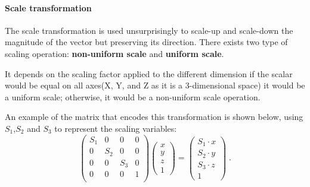 \documentclass[12pt,a4paper]{extarticle}
\begin{document}
\paragraph{Scale transformation} The scale transformation is used unsurprisingly to scale-up and scale-down the magnitude of the vector but preserving its direction. There exists two type of scaling operation: \textbf{non-uniform scale} and \textbf{uniform scale}. 

It depends on the scaling factor applied to the different dimension if the scalar would be equal on all axes(X, Y, and Z as it is a 3-dimensional space) it would be a uniform scale; otherwise, it would be a non-uniform scale operation. 

An example of the matrix that encodes this transformation is shown below, using $S_{1}$,$S_{2}$ and $S_{3}$ to represent the scaling variables:
\[
\begin{pmatrix}
S_{1} & 0 & 0 & 0\\
0 & S_{2} & 0 & 0\\
0 & 0 & S_{3} & 0\\
0 & 0 & 0 & 1\\
\end{pmatrix}
\begin{pmatrix}
x\\
y\\
z\\
1
\end{pmatrix}
=
\begin{pmatrix}
S_{1} \cdot x\\
S_{2} \cdot y\\
S_{3} \cdot z \\
1
\end{pmatrix}
\;.
\]
\end{document}
